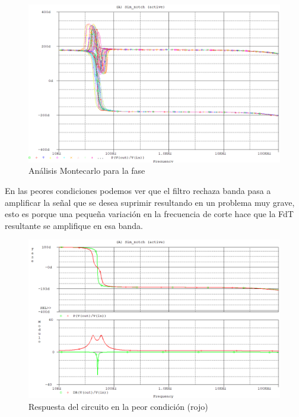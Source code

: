 \documentclass[12pt]{article}
\begin{document}
	\begin{figure}
		\includegraphics[width=1\linewidth]{Imagenes/montecarlo_fase}
		\caption[Análisis Montecarlo para la fase]{Análisis Montecarlo para la fase}
		\label{fig:montecarlofase}
	\end{figure}\newpage
	
	En las peores condiciones podemos ver que el filtro rechaza banda pasa a amplificar la señal que se desea suprimir resultando en un problema muy grave, esto es porque una pequeña variación en la frecuencia de corte hace que la FdT resultante se amplifique en esa banda.
	\begin{figure}
		\includegraphics[width=1\linewidth]{Imagenes/peor_condicion}
		\caption[Respuesta del circuito en la peor condición (rojo)]{Respuesta del circuito en la peor condición (rojo)}
		\label{fig:peorcondicion}
	\end{figure}
	
	
	
	
	
\end{document}
